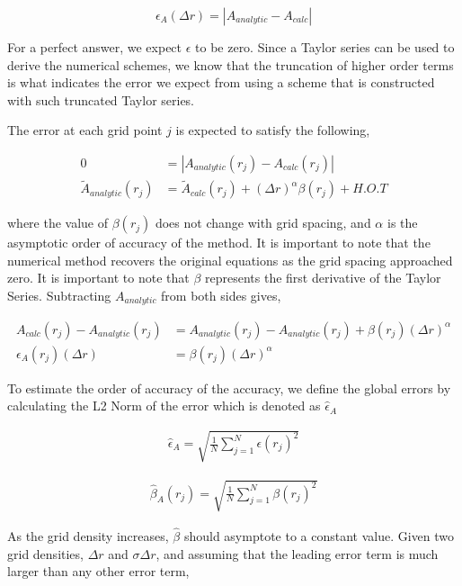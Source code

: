 \documentclass[12pt]{article}
\begin{document}
\[ \epsilon_{A}(\Delta r) = |A_{analytic}-A_{calc}|\]

For a perfect answer, we expect $\epsilon$ to be zero. Since a Taylor series can 
be used to derive the numerical schemes, we know that the truncation of higher
order terms is what indicates the error we expect from using a scheme that 
is constructed with such truncated Taylor series.

The error at each grid point $j$ is expected to satisfy the following,

\begin{align*}
    0 &= |A_{analytic}(r_j) - A_{calc}(r_j)| \\
    \widetilde{A}_{analytic}(r_j) &= \widetilde{A}_{calc}(r_j) +
    (\Delta r)^{\alpha} \beta(r_j)  + H.O.T
\end{align*}

where the value of $\beta(r_j)$ does not change with grid spacing, and 
$\alpha$ is the asymptotic order of accuracy of the method. It is important to
note that the numerical method recovers the original equations as the grid 
spacing approached zero.  It is important to note that $\beta$ represents the
first derivative of the Taylor Series.  Subtracting $A_{analytic}$ from both
sides gives,

\begin{align*}
    A_{calc}(r_j) - A_{analytic}(r_j) &= A_{analytic}(r_j) - A_{analytic}(r_j)
    + \beta(r_j) (\Delta r)^{\alpha} \\
    \epsilon_A(r_j)(\Delta r) &= \beta(r_j) (\Delta r)^{\alpha}
\end{align*}

To estimate the order of accuracy of the accuracy, we define the global errors 
by calculating the L2 Norm of the error which is denoted as $\hat{\epsilon}_A$ 

\begin{align*}
    \hat{\epsilon}_A = \sqrt{\frac{1}{N}\sum_{j=1}^{N} \epsilon(r_j)^2  }
\end{align*}

\begin{align*}
    \hat{\beta}_A(r_j) = \sqrt{\frac{1}{N}\sum_{j=1}^{N} \beta(r_j)^2  }
\end{align*}

As the grid density increases, $\hat{\beta}$ should asymptote to a constant 
value. Given two grid densities, $\Delta r$ and $\sigma\Delta r$, and assuming
that the leading error term is much larger than any other error term,
\end{document}
